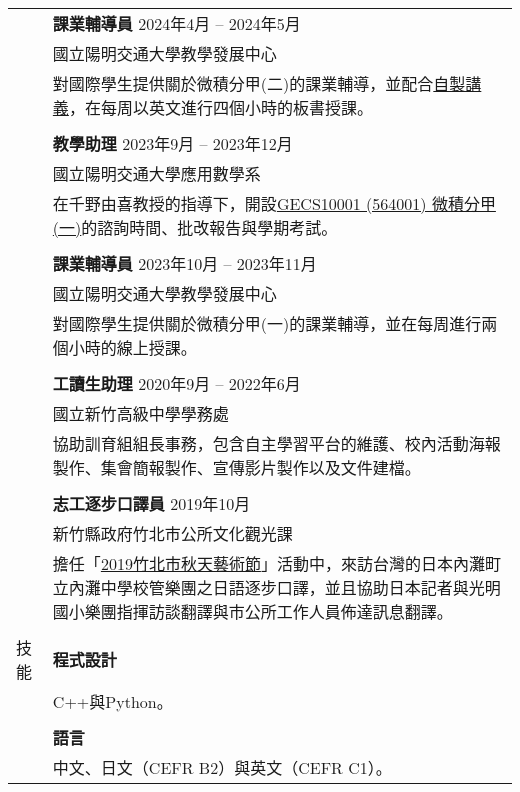 \documentclass[letterpaper, 11pt]{article}
\begin{document}
\begin{CJK*}{UTF8}{bsmi}
\begin{center}
\begin{longtable}{p{0.72in}p{5.97in}}
        & \textbf{課業輔導員} \hfill 2024年4月 -- 2024年5月 \\
        & 國立陽明交通大學教學發展中心\\
        & 對國際學生提供關於微積分甲(二)的課業輔導，並配合\href{https://github.com/eiken59/2024_II_Tutor}{自製講義}，在每周以英文進行四個小時的板書授課。\\
        & \\

        & \textbf{教學助理} \hfill 2023年9月 -- 2023年12月 \\
        & 國立陽明交通大學應用數學系\\
        & 在千野由喜教授的指導下，開設\href{https://timetable.nycu.edu.tw/?r=main/crsoutline&Acy=112&Sem=1&CrsNo=564001&lang=zh-tw}{GECS10001 (564001) 微積分甲(一)}的諮詢時間、批改報告與學期考試。\\
        & \\

        & \textbf{課業輔導員} \hfill 2023年10月 -- 2023年11月 \\
        & 國立陽明交通大學教學發展中心\\
        & 對國際學生提供關於微積分甲(一)的課業輔導，並在每周進行兩個小時的線上授課。\\
        & \\
        
        & \textbf{工讀生助理} \hfill 2020年9月 -- 2022年6月 \\
        & 國立新竹高級中學學務處\\
        & 協助訓育組組長事務，包含自主學習平台的維護、校內活動海報製作、集會簡報製作、宣傳影片製作以及文件建檔。\\
        & \\

        & \textbf{志工逐步口譯員} \hfill 2019年10月\\
        & 新竹縣政府竹北市公所文化觀光課\\
        & 擔任「\href{https://www.chupei.gov.tw/travel/p2_1_2.php?bigact_id=111}{2019竹北市秋天藝術節}」活動中，來訪台灣的日本內灘町立內灘中學校管樂團之日語逐步口譯，並且協助日本記者與光明國小樂團指揮訪談翻譯與市公所工作人員佈達訊息翻譯。\\
        & \\
        
        
        {\textcolor{OliveGreen}{技能}} 
        & \textbf{程式設計}\\
        & C++與Python。 \\
        & \\
        
        & \textbf{語言} \\
        & 中文、日文（CEFR B2）與英文（CEFR C1）。 \\
        
        
    \end{longtable}
\end{center}

\end{CJK*}
\end{document}
